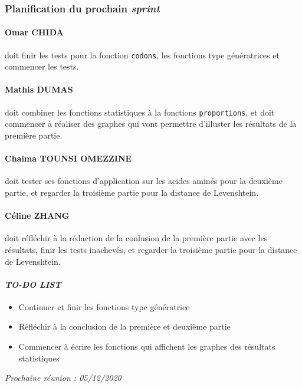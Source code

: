 \subsubsection*{Planification du prochain \textsl{sprint}}
\paragraph*{Omar CHIDA} doit finir les tests pour la fonction \texttt{codons}, les fonctions type génératrices et commencer les tests.

\paragraph*{Mathis DUMAS} doit combiner les fonctions statistiques à la fonctions \texttt{proportions}, et doit commencer à réaliser des graphes qui vont permettre d'illuster les résultats de la première partie.

\paragraph*{Chaima TOUNSI OMEZZINE} doit tester ses fonctions d'application sur les acides aminés pour la deuxième partie, et regarder la troisième partie pour la distance de Levenshtein.

\paragraph*{Céline ZHANG} doit réfléchir à la rédaction de la conlusion de la première partie avec les résultats, finir les tests inachevés, et regarder la troisième partie pour la distance de Levenshtein.

\paragraph{\emph{TO-DO LIST}}
\begin{itemize}
    \item Continuer et finir les fonctions type génératrice
    \item Réfléchir à la conclusion de la première et deuxième partie
    \item Commencer à écrire les fonctions qui affichent les graphes des résultats statistiques
\end{itemize}

\emph{Prochaine réunion : 05/12/2020}\\

% 